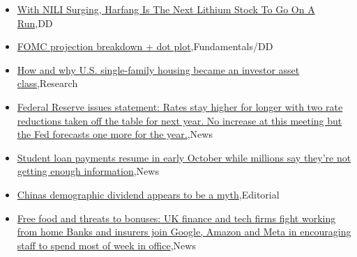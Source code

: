 \documentclass{article}%
\begin{document}
%
\begin{itemize}%
\item%
\href{https://reddit.com/r/Baystreetbets/comments/16nops6/with\_nili\_surging\_harfang\_is\_the\_next\_lithium/}{With NILI Surging, Harfang Is The Next Lithium Stock To Go On A Run},DD%
\item%
\href{https://reddit.com/r/StockMarket/comments/16nt9h9/fomc\_projection\_breakdown\_dot\_plot/}{FOMC projection breakdown + dot plot},Fundamentals/DD%
\item%
\href{https://reddit.com/r/Economics/comments/16ntj7y/how\_and\_why\_us\_singlefamily\_housing\_became\_an/}{How and why U.S. single-family housing became an investor asset class},Research%
\item%
\href{https://reddit.com/r/Economics/comments/16ns5zh/federal\_reserve\_issues\_statement\_rates\_stay/}{Federal Reserve issues statement: Rates stay higher for longer with two rate reductions taken off the table for next year. No increase at this meeting but the Fed forecasts one more for the year.},News%
\item%
\href{https://reddit.com/r/Economics/comments/16njbfi/student\_loan\_payments\_resume\_in\_early\_october/}{Student loan payments resume in early October while millions say they're not getting enough information},News%
\item%
\href{https://reddit.com/r/Economics/comments/16n8a13/chinas\_demographic\_dividend\_appears\_to\_be\_a\_myth/}{Chinas demographic dividend appears to be a myth},Editorial%
\item%
\href{https://reddit.com/r/Economics/comments/16n1kxo/free\_food\_and\_threats\_to\_bonuses\_uk\_finance\_and/}{Free food and threats to bonuses: UK finance and tech firms fight working from home  Banks and insurers join Google, Amazon and Meta in encouraging staff to spend most of week in office},News%
\end{itemize}%
\end{document}
